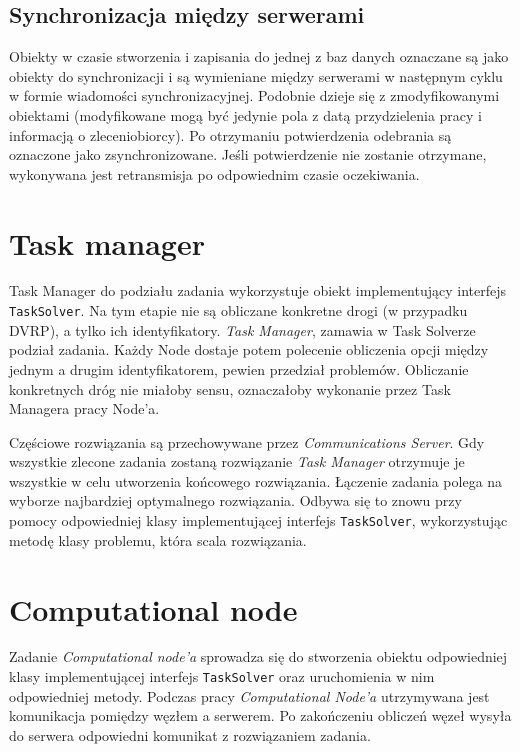 \documentclass[12pt,a4paper,titlepage]{report}
\begin{document}
	\section{Synchronizacja między serwerami}
		Obiekty w czasie stworzenia i zapisania do jednej z baz danych oznaczane są jako obiekty
		do synchronizacji i są wymieniane między serwerami w następnym cyklu w formie wiadomości
		synchronizacyjnej. Podobnie dzieje się z zmodyfikowanymi obiektami (modyfikowane
		mogą być jedynie pola z datą przydzielenia pracy i informacją o zleceniobiorcy).
		Po otrzymaniu potwierdzenia odebrania są oznaczone jako zsynchronizowane. Jeśli
		potwierdzenie nie zostanie otrzymane, wykonywana jest retransmisja po odpowiednim
		czasie oczekiwania.
	
	\chapter{Task manager}
		Task Manager do podziału zadania wykorzystuje obiekt implementujący interfejs \verb+TaskSolver+. Na tym etapie nie są obliczane konkretne drogi (w przypadku DVRP), a tylko ich identyfikatory. \textit{Task Manager}, zamawia w Task Solverze podział zadania. Każdy Node dostaje potem polecenie obliczenia opcji między jednym a drugim identyfikatorem, pewien przedział problemów. Obliczanie konkretnych dróg nie miałoby sensu, oznaczałoby wykonanie przez Task Managera pracy Node'a.
		
		Częściowe rozwiązania są przechowywane przez \textit{Communications Server}. Gdy wszystkie zlecone zadania zostaną rozwiązanie \textit{Task Manager} otrzymuje je wszystkie w celu utworzenia końcowego rozwiązania. Łączenie zadania polega na wyborze najbardziej optymalnego rozwiązania. Odbywa się to znowu przy pomocy odpowiedniej klasy implementującej interfejs \verb+TaskSolver+, wykorzystując metodę klasy problemu, która scala rozwiązania.
	
	\chapter{Computational node}
		Zadanie \textit{Computational node'a} sprowadza się do stworzenia obiektu odpowiedniej klasy implementującej interfejs \verb+TaskSolver+ oraz uruchomienia w nim odpowiedniej metody. Podczas pracy \textit{Computational Node'a } utrzymywana jest komunikacja pomiędzy węzłem a serwerem. Po zakończeniu obliczeń węzeł wysyła do serwera odpowiedni komunikat z rozwiązaniem zadania.
		
\end{document}
